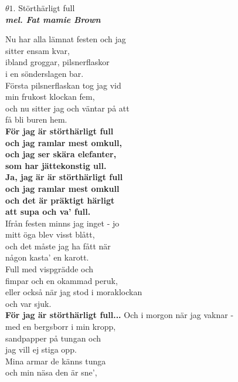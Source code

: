 \documentclass[a6paper,10pt]{article}
\newcommand{\mel}[1]{\small\textbf{\textit{mel. #1 \\}}}
\begin{document}
\setlength{\oddsidemargin}{-0.47in}
\begin{center}
\Large $\theta1$. Störthärligt full \\ 
\mel{Fat mamie Brown}
\end{center}
\small Nu har alla lämnat festen och jag \\
sitter ensam kvar,\\
ibland groggar, pilsnerflaskor\\
i en sönderslagen bar.\\
Första pilsnerflaskan tog jag vid\\
min frukost klockan fem,\\
och nu sitter jag och väntar på att\\
få bli buren hem.
\vspace{5pt}\\
\textbf{För jag är störthärligt full\\
och jag ramlar mest omkull,\\
och jag ser skära elefanter,\\
som har jättekonstig ull.\\
Ja, jag är är störthärligt full\\
och jag ramlar mest omkull\\
och det är präktigt härligt\\
att supa och va' full.}
\vspace{5pt}\\
Ifrån festen minns jag inget - jo\\
mitt öga blev visst blått,\\
och det måste jag ha fått när\\
någon kasta' en karott.\\
Full med vispgrädde och\\
fimpar och en okammad peruk,\\
eller också när jag stod i moraklockan\\
och var sjuk.
\vspace{5pt}\\
\textbf{För jag är störthärligt full...}
\setlength{\oddsidemargin}{-0.37in}
\noindent
Och i morgon när jag vaknar -\\
med en bergsborr i min kropp,\\
sandpapper på tungan och\\
jag vill ej stiga opp.\\
Mina armar de känns tunga\\
och min näsa den är sne',\\
\end{document}
